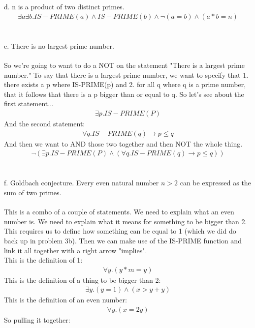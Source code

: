 \documentclass{article}
\begin{document}
d. n is a product of two distinct primes.
\begin {align*}
\exists a \exists b. IS-PRIME(a) \wedge IS-PRIME(b) \wedge \neg (a = b) \wedge (a * b = n)
\end {align*}
\\\\
e. There is no largest prime number.
\\\\
So we're going to want to do a NOT on the statement "There is a largest prime number." To say that there is a largest prime number, we want to specify that 1. there exists a p where IS-PRIME(p) and 2. for all q where q is a prime number, that it follows that there is a p bigger than or equal to q. So let's see about the first statement...
\begin {align*}
\exists p. IS-PRIME(P)
\end {align*}
And the second statement:
\begin {align*}
\forall q. IS-PRIME(q) \rightarrow p \leq q
\end {align*}
And then we want to AND those two together and then NOT the whole thing.
\begin {align*}
\neg (\exists p. IS-PRIME(P) \wedge (\forall q. IS-PRIME(q) \rightarrow p \leq q))
\end {align*}
\\\\
f. Goldbach conjecture. Every even natural number $n > 2$ can be expressed as the sum of two primes. 
\\\\
This is a combo of a couple of statements. We need to explain what an even number is. We need to explain what it means for something to be bigger than 2. This requires us to define how something can be equal to 1 (which we did do back up in problem 3b). Then we can make use of the IS-PRIME function and link it all together with a right arrow "implies". 
\\
This is the definition of 1:
\begin {align*}
\forall y. (y*m = y)
\end {align*}
This is the definition of a thing to be bigger than 2:
\begin {align*}
\exists y. (y = 1) \wedge (x > y + y)
\end {align*}
This is the definition of an even number:
\begin {align*}
\forall y. (x = 2y)
\end {align*}
So pulling it together:
\end{document}

